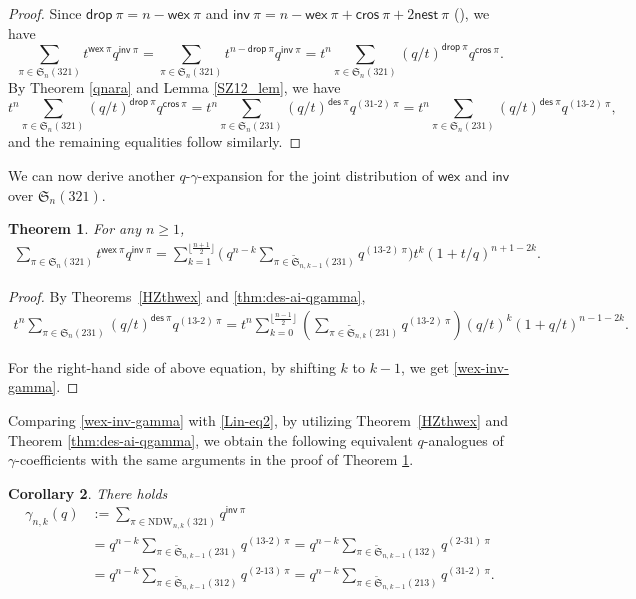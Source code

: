 \documentclass[12pt,reqno]{amsart}
\numberwithin{equation}{section}
\theoremstyle{plain}
\newtheorem{theorem}{Theorem}[section]
\newtheorem{corollary}[theorem]{Corollary}
\theoremstyle{definition}
\def\S{\mathfrak{S}}
\def\des{\mathsf{des}}
\def\inv{\mathsf{inv}}
\def\nest{\mathsf{nest}}
\def\cros{\mathsf{cros}}
\def\wex{\mathsf{wex}}
\def\drop{\mathsf{drop}}
\def\cab{31\text{-}2}
\def\bca{2\text{-}31}
\def\acb{13\text{-}2}
\def\bac{2\text{-}13}
\begin{document}
\begin{proof}
Since $\drop\:\pi=n-\wex\:\pi$ and $\inv\:\pi=n-\wex\:\pi+\cros\:\pi+2\nest\:\pi$ (\cite[Eq. (40)]{SZ10}), we have
\begin{equation*}
\sum_{\pi\in \S_n(321)} t^{\wex\:\pi}q^{\inv\:\pi}=\sum_{\pi\in \S_n(321)} t^{n-\drop\:\pi}q^{\inv\:\pi}
=t^n\sum_{\pi\in \S_n(321)} ({q}/{t})^{\drop\:\pi}q^{\cros\:\pi}.
\end{equation*}
By Theorem \ref{qnara} and Lemma \ref{SZ12_lem}, we have
$$t^n\sum_{\pi\in \S_n(321)} ({q}/{t})^{\drop\:\pi}q^{\cros\:\pi}=
t^n\sum_{\pi\in \S_n(231)} ({q}/{t})^{\des\:\pi}q^{(\cab)\:\pi}=t^n\sum_{\pi\in \S_n(231)} ({q}/{t})^{\des\:\pi}q^{(\acb)\:\pi},$$
and the remaining equalities follow similarly.
\end{proof}

We can now derive another $q$-$\gamma$-expansion for the joint distribution of $\wex$ and $\inv$ over $\S_n(321)$.
\begin{theorem}\label{qwex}
For any $n\geq 1$,
\begin{align}\label{wex-inv-gamma}
\sum_{\pi\in \S_{n}(321)}t^{\wex\:\pi}q^{\inv\:\pi}=\sum_{k=1}^{\lfloor\frac{n+1}{2}\rfloor}\biggl(\:q^{n-k}\sum_{\pi\in \widetilde{\S}_{n,k-1}(231)}q^{(\acb)\:\pi}\biggr)t^k(1+t/q)^{n+1-2k}.
\end{align}
\end{theorem}
\begin{proof}
By Theorems~\ref{HZthwex} and \ref{thm:des-ai-qgamma},
\begin{align*}
t^n\sum_{\pi\in \S_n(231)} ({q}/{t})^{\des\:\pi}q^{(\acb)\:\pi}
=t^n\sum_{k=0}^{\lfloor\frac{n-1}{2}\rfloor}\left(\sum_{\pi\in\widetilde{\S}_{n, k}(231)} {q^{(\acb)\:\pi}}\right)(q/t)^k(1+q/t)^{n-1-2k}.
\end{align*}

For the right-hand side of above equation,  by shifting $k$ to $k-1$, we get \eqref{wex-inv-gamma}.
\end{proof}

Comparing \eqref{wex-inv-gamma} with \eqref{Lin-eq2}, by utilizing Theorem~\ref{HZthwex} and Theorem \ref{thm:des-ai-qgamma}, we obtain the following equivalent
$q$-analogues of $\gamma$-coefficients with the same arguments in the proof of Theorem \ref{qwex}.

\begin{corollary}\label{gammacoef-othercomb}
There holds
\begin{align*}
\gamma_{n, k}(q)&:=\sum_{\pi\in \mathrm{NDW}_{n,k}(321)}q^{\inv\:\pi}\\
&=q^{n-k}\sum_{\pi\in \widetilde{\S}_{n,k-1}(231)}q^{(\acb)\:\pi}=q^{n-k}\sum_{\pi\in \widetilde{\S}_{n,k-1}(132)}q^{(\bca)\:\pi}\\
&=q^{n-k}\sum_{\pi\in \widetilde{\S}_{n,k-1}(312)}q^{(\bac)\:\pi}=q^{n-k}\sum_{\pi\in \widetilde{\S}_{n,k-1}(213)}q^{(\cab)\:\pi}.
\end{align*}
\end{corollary}
\end{document}
